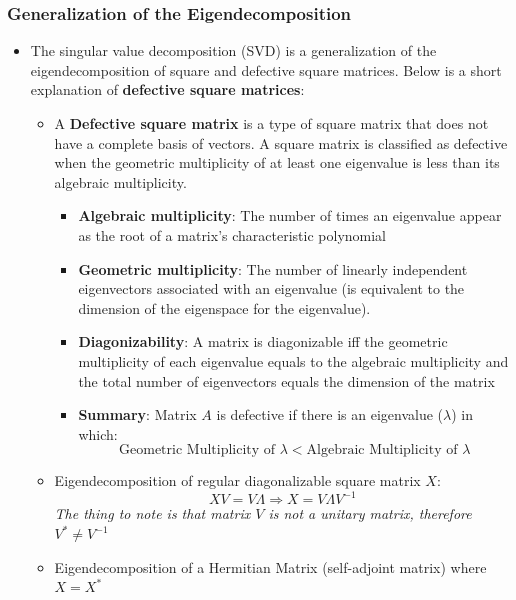 \documentclass[11.5pt,a4paper]{article}
\begin{document}
\subsubsection*{Generalization of the Eigendecomposition}

\begin{itemize}
    \item The singular value decomposition (SVD) is a generalization of the eigendecomposition of square and defective square matrices. Below is a short explanation of \textbf{defective square matrices}:
    \begin{itemize}
        \item A \textbf{Defective square matrix} is a type of square matrix that does not have a complete basis of vectors. A square matrix is classified as defective when the geometric multiplicity of at least one eigenvalue is less than its algebraic multiplicity.
        \begin{itemize}
            \item \textbf{Algebraic multiplicity}: The number of times an eigenvalue appear as the root of a matrix's characteristic polynomial
            \item \textbf{Geometric multiplicity}: The number of linearly independent eigenvectors associated with an eigenvalue (is equivalent to the dimension of the eigenspace for the eigenvalue).
            \item \textbf{Diagonizability}: A matrix is diagonizable iff the geometric multiplicity of each eigenvalue equals to the algebraic multiplicity and the total number of eigenvectors equals the dimension of the matrix
            \item \textbf{Summary}: Matrix $A$ is defective if there is an eigenvalue ($\lambda$) in which:
            \begin{equation*}
                \text{Geometric Multiplicity of $\lambda$} < \text{Algebraic Multiplicity of $\lambda$}
            \end{equation*}
        \end{itemize}
        \item Eigendecomposition of regular diagonalizable square matrix $X$:
        \begin{equation*}
            XV = V\Lambda \Rightarrow X = V\Lambda V^{-1}
        \end{equation*}
        \textit{The thing to note is that matrix $V$ is not a unitary matrix, therefore $V^* \neq V^{-1}$}
        \item Eigendecomposition of a Hermitian Matrix (self-adjoint matrix) where $X = X^*$

\end{itemize}
\end{itemize}
\end{document}
